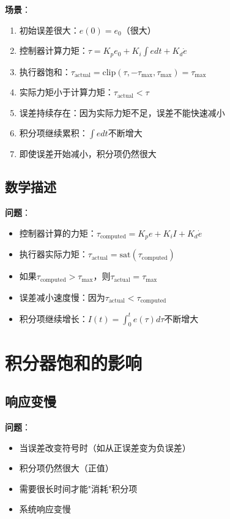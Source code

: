 \documentclass[12pt,a4paper]{article}
\begin{document}
\textbf{场景}：
\begin{enumerate}
\item 初始误差很大：$e(0) = e_0$（很大）
\item 控制器计算力矩：$\tau = K_p e_0 + K_i \int e dt + K_d \dot{e}$
\item 执行器饱和：$\tau_{\text{actual}} = \text{clip}(\tau, -\tau_{\max}, \tau_{\max}) = \tau_{\max}$
\item 实际力矩小于计算力矩：$\tau_{\text{actual}} < \tau$
\item 误差持续存在：因为实际力矩不足，误差不能快速减小
\item 积分项继续累积：$\int e dt$不断增大
\item 即使误差开始减小，积分项仍然很大
\end{enumerate}

\subsection{数学描述}

\textbf{问题}：
\begin{itemize}
\item 控制器计算的力矩：$\tau_{\text{computed}} = K_p e + K_i I + K_d \dot{e}$
\item 执行器实际力矩：$\tau_{\text{actual}} = \text{sat}(\tau_{\text{computed}})$
\item 如果$\tau_{\text{computed}} > \tau_{\max}$，则$\tau_{\text{actual}} = \tau_{\max}$
\item 误差减小速度慢：因为$\tau_{\text{actual}} < \tau_{\text{computed}}$
\item 积分项继续增长：$I(t) = \int_0^t e(\tau) d\tau$不断增大
\end{itemize}

\section{积分器饱和的影响}

\subsection{响应变慢}

\textbf{问题}：
\begin{itemize}
\item 当误差改变符号时（如从正误差变为负误差）
\item 积分项仍然很大（正值）
\item 需要很长时间才能"消耗"积分项
\item 系统响应变慢
\end{itemize}
\end{document}
